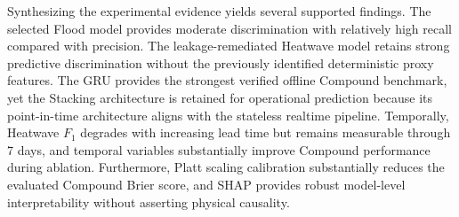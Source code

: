 Synthesizing the experimental evidence yields several supported findings. The selected Flood model provides moderate discrimination with relatively high recall compared with precision. The leakage-remediated Heatwave model retains strong predictive discrimination without the previously identified deterministic proxy features. The GRU provides the strongest verified offline Compound benchmark, yet the Stacking architecture is retained for operational prediction because its point-in-time architecture aligns with the stateless realtime pipeline. Temporally, Heatwave $F_1$ degrades with increasing lead time but remains measurable through 7 days, and temporal variables substantially improve Compound performance during ablation. Furthermore, Platt scaling calibration substantially reduces the evaluated Compound Brier score, and SHAP provides robust model-level interpretability without asserting physical causality.
